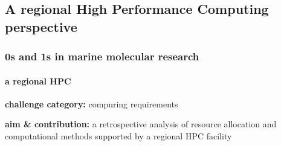 \documentclass{beamer}
\begin{document}
   \begin{darkframes}
      \section{
         A regional High Performance Computing perspective
         }

      \begin{frame}
         \frametitle{0s and 1s in marine molecular research}
         \framesubtitle{a regional HPC}
 

         \textbf{challenge category:} compuring requirements

         \bigskip

         \textbf{aim \& contribution:}
         a retrospective analysis of resource allocation and computational methods supported by a regional HPC facility 


      \end{frame}
   \end{darkframes}
\end{document}
